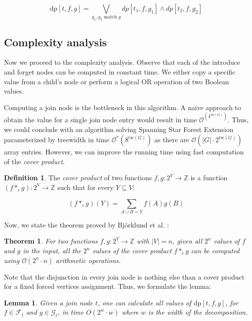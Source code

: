 \documentclass[en]{pracamgr}
\newtheorem{theorem}{Theorem}
\newtheorem{lemma}{Lemma}
\theoremstyle{definition}
\newtheorem{definition}{Definition}
\newcommand{\ssfep}{{\sc Spanning Star Forest Extension}}
\newcommand{\dpt}[1]{\textrm{dp}[#1]}
\newcommand{\tw}{\textrm{tw}}
\begin{document}
\begin{equation*}
	\dpt{t,f,g} =
		\bigvee\limits_{g_1,g_2 \text{ match $g$}} dp[t_1,f,g_1] \land dp[t_2,f,g_2]
\end{equation*}

\subsection{Complexity analysis}

Now we proceed to the complexity analysis. Observe that each of the introduce and forget nodes can be computed in constant time. We either copy a specific value from a child's node or perform a logical OR operation of two Boolean values. 

Computing a join node is the bottleneck in this algorithm. A naive approach to obtain the value for a single join node entry would result in time $\mathcal{O}^(4^{\tw(G)})$. Thus, we could conclude with an algorithm solving \ssfep{} parameterized by treewidth in time $\mathcal{O}^*(8^{\tw(G)})$ as there are $\mathcal{O}(|G| \cdot 2^{\tw(G)})$ array entries. However, we can improve the running time using fast computation of the \textit{cover product}.

\begin{definition}
	The \textit{cover product} of two functions $f,g:2^V \rightarrow \mathbb{Z}$ is a function $(f *_c g):2^V \rightarrow \mathbb{Z}$ such that for every $Y \subseteq V$:
	
	\begin{equation*}
		(f *_c g)(Y) = \sum\limits_{ A \cup B = Y} f(A)g(B)
	\end{equation*}
\end{definition}

Now, we state the theorem proved by Björklund et al. \cite{CoverProduct}:

\begin{theorem}\label{cproduct}
	For two functions $f,g:2^V \rightarrow \mathbb{Z}$ with $|V|=n$, given all $2^n$ values of $f$ and $g$ in the input, all the $2^n$ values of the cover product $f*_cg$ can be computed using $\mathcal{O}(2^n\cdot n)$ arithmetic operations.
\end{theorem}

Note that the disjunction in every join node is nothing else than a cover product for a fixed forced vertices assignment. Thus, we formulate the lemma:

\begin{lemma}\label{join lemma}
	Given a join node $t$, one can calculate all values of $\dpt{t,f,g}$, for $f \in \mathcal{F}_t$ and $g \in \mathcal{G}_t$, in time $O(2^w \cdot w)$ where $w$ is the width of the decomposition.
\end{lemma}
\end{document}
